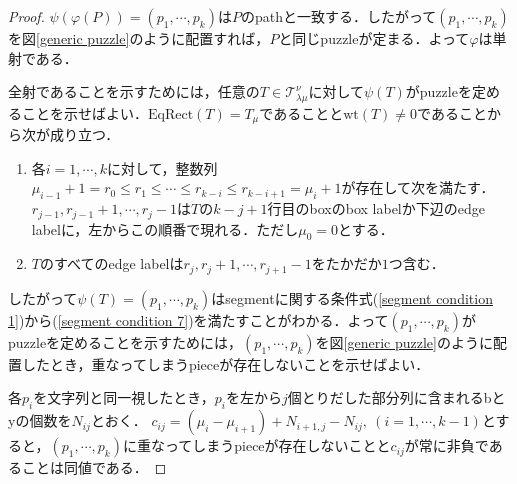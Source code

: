 \begin{proof}
  $\psi(\varphi(P))=(p_1,\cdots,p_k)$は$P$のpathと一致する．したがって$(p_1,\cdots,p_k)$を図\ref{generic puzzle}のように配置すれば，$P$と同じpuzzleが定まる．よって$\varphi$は単射である．

  全射であることを示すためには，任意の$T\in\mathcal{T}^\nu_{\lambda\mu}$に対して$\psi(T)$がpuzzleを定めることを示せばよい．$\text{EqRect}(T)=T_\mu$であることと$\text{wt}(T)\neq 0$であることから次が成り立つ．
  \begin{enumerate}
    \item 各$i=1,\cdots,k$に対して，整数列$\mu_{i-1}+1=r_0\leq r_{1}\leq\cdots\leq r_{k-i}\leq r_{k-i+1}=\mu_i+1$が存在して次を満たす．$r_{j-1},r_{j-1}+1,\cdots,r_{j}-1$は$T$の$k-j+1$行目のboxのbox labelか下辺のedge labelに，左からこの順番で現れる．ただし$\mu_0=0$とする．
    \item $T$のすべてのedge labelは$r_{j},r_{j}+1,\cdots,r_{j+1}-1$をたかだか$1$つ含む．
  \end{enumerate}
  したがって$\psi(T)=(p_1,\cdots,p_k)$はsegmentに関する条件式(\ref{segment condition 1})から(\ref{segment condition 7})を満たすことがわかる．よって$(p_1,\cdots,p_k)$がpuzzleを定めることを示すためには，$(p_1,\cdots,p_k)$を図\ref{generic puzzle}のように配置したとき，重なってしまうpieceが存在しないことを示せばよい．

  各$p_i$を文字列と同一視したとき，$p_i$を左から$j$個とりだした部分列に含まれるbとyの個数を$N_{ij}$とおく．
  $c_{ij} =(\mu_i - \mu_{i+1}) + N_{i+1,j} - N_{ij}, \:(i=1,\cdots,k-1)$とすると，$(p_1,\cdots,p_k)$に重なってしまうpieceが存在しないことと$c_{ij}$が常に非負であることは同値である．
\end{proof}
